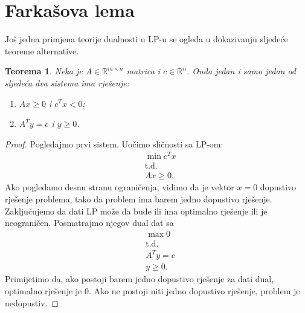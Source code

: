 \documentclass[a4paper, utf8, 11pt, colorlinks]{book}
\newtheorem{thm}{Teorema}[chapter]
\theoremstyle{definition}
\begin{document}
\section{Farkašova lema}
Još jedna primjena teorije dualnosti u LP-u se ogleda u dokazivanju sljedeće teoreme alternative.

\begin{thm}
	Neka je $A\in \mathbb{R}^{m \times n}$ matrica i $c\in \mathbb{R}^n$. Onda jedan i samo jedan od  sljedeća dva sistema ima rješenje:
	\begin{enumerate}
		\item  $Ax \geq 0$  i $c^T x < 0$; \label{case:1}
		\item $A^T y = c$ i $y \geq 0$. \label{case:2}
	\end{enumerate}
\end{thm}
\begin{proof}
	  Pogledajmo prvi sistem. Uočimo sličnosti sa   LP-om:
	  \begin{align*}
	  	 &\min c^T x \\
	  	 &\mbox{t.d.} \\
	  	 & A x \geq 0.
	  \end{align*}
 Ako pogledamo desnu stranu ograničenja, vidimo da je vektor $x = 0$ 
  dopustivo rješenje problema, tako da problem ima barem jedno dopustivo rješenje. Zaključujemo da dati LP može da bude ili ima optimalno rješenje ili je neograničen. Posmatrajmo njegov dual   dat sa 
  \begin{align*}
  	   &\max 0 \\
  	   &\mbox{t.d.} \\
  	   & A^T y  = c \\
  	   & y \geq 0.
  \end{align*}
  Primijetimo da, ako postoji barem jedno dopustivo rješenje za dati dual, optimalno rješenje je 0. Ako ne postoji niti jedno dopustivo rješenje, problem je nedopustiv. 
  

\end{proof}
\end{document}
